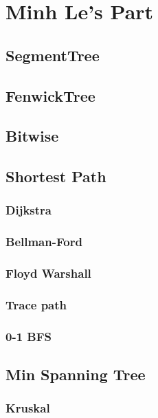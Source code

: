 \chapter{Minh Le's Part}

\section{SegmentTree}

\section{FenwickTree}

\section{Bitwise}
	
\section{Shortest Path}
	\subsection{Dijkstra}
	\subsection{Bellman-Ford}
	\subsection{Floyd Warshall}
	\subsection{Trace path}
	\subsection{0-1 BFS}

\section{Min Spanning Tree}
	\subsection{Kruskal}
